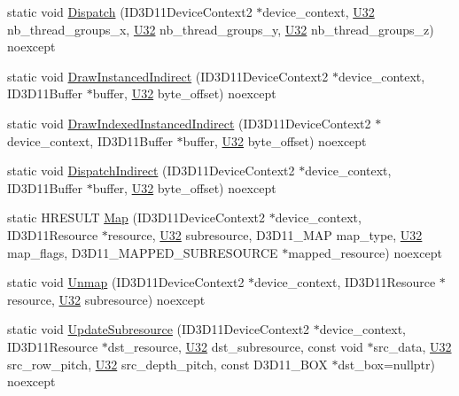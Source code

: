 \begin{DoxyCompactItemize}
\item 
static void \hyperlink{structmage_1_1_pipeline_a12b671ab7336729b0addd6d6393e03fe}{Dispatch} (I\+D3\+D11\+Device\+Context2 $\ast$device\+\_\+context, \hyperlink{namespacemage_a41c104c036fba3756a74e19f793eeaa1}{U32} nb\+\_\+thread\+\_\+groups\+\_\+x, \hyperlink{namespacemage_a41c104c036fba3756a74e19f793eeaa1}{U32} nb\+\_\+thread\+\_\+groups\+\_\+y, \hyperlink{namespacemage_a41c104c036fba3756a74e19f793eeaa1}{U32} nb\+\_\+thread\+\_\+groups\+\_\+z) noexcept
\item 
static void \hyperlink{structmage_1_1_pipeline_a0386605c4c25f48e1f1a8730282c6f37}{Draw\+Instanced\+Indirect} (I\+D3\+D11\+Device\+Context2 $\ast$device\+\_\+context, I\+D3\+D11\+Buffer $\ast$buffer, \hyperlink{namespacemage_a41c104c036fba3756a74e19f793eeaa1}{U32} byte\+\_\+offset) noexcept
\item 
static void \hyperlink{structmage_1_1_pipeline_a1922148c0e8833e101c1370e449bd55c}{Draw\+Indexed\+Instanced\+Indirect} (I\+D3\+D11\+Device\+Context2 $\ast$device\+\_\+context, I\+D3\+D11\+Buffer $\ast$buffer, \hyperlink{namespacemage_a41c104c036fba3756a74e19f793eeaa1}{U32} byte\+\_\+offset) noexcept
\item 
static void \hyperlink{structmage_1_1_pipeline_a07d7a4f38653785034b4af57358d6bd6}{Dispatch\+Indirect} (I\+D3\+D11\+Device\+Context2 $\ast$device\+\_\+context, I\+D3\+D11\+Buffer $\ast$buffer, \hyperlink{namespacemage_a41c104c036fba3756a74e19f793eeaa1}{U32} byte\+\_\+offset) noexcept
\item 
static H\+R\+E\+S\+U\+LT \hyperlink{structmage_1_1_pipeline_af41fb335c1ef0030522ba02c28158759}{Map} (I\+D3\+D11\+Device\+Context2 $\ast$device\+\_\+context, I\+D3\+D11\+Resource $\ast$resource, \hyperlink{namespacemage_a41c104c036fba3756a74e19f793eeaa1}{U32} subresource, D3\+D11\+\_\+\+M\+AP map\+\_\+type, \hyperlink{namespacemage_a41c104c036fba3756a74e19f793eeaa1}{U32} map\+\_\+flags, D3\+D11\+\_\+\+M\+A\+P\+P\+E\+D\+\_\+\+S\+U\+B\+R\+E\+S\+O\+U\+R\+CE $\ast$mapped\+\_\+resource) noexcept
\item 
static void \hyperlink{structmage_1_1_pipeline_a6ad3d6eae03e2b63becfb55a83ae3027}{Unmap} (I\+D3\+D11\+Device\+Context2 $\ast$device\+\_\+context, I\+D3\+D11\+Resource $\ast$resource, \hyperlink{namespacemage_a41c104c036fba3756a74e19f793eeaa1}{U32} subresource) noexcept
\item 
static void \hyperlink{structmage_1_1_pipeline_a2b24f1b3d95b1c4044414f6817758fa8}{Update\+Subresource} (I\+D3\+D11\+Device\+Context2 $\ast$device\+\_\+context, I\+D3\+D11\+Resource $\ast$dst\+\_\+resource, \hyperlink{namespacemage_a41c104c036fba3756a74e19f793eeaa1}{U32} dst\+\_\+subresource, const void $\ast$src\+\_\+data, \hyperlink{namespacemage_a41c104c036fba3756a74e19f793eeaa1}{U32} src\+\_\+row\+\_\+pitch, \hyperlink{namespacemage_a41c104c036fba3756a74e19f793eeaa1}{U32} src\+\_\+depth\+\_\+pitch, const D3\+D11\+\_\+\+B\+OX $\ast$dst\+\_\+box=nullptr) noexcept

\end{DoxyCompactItemize}
